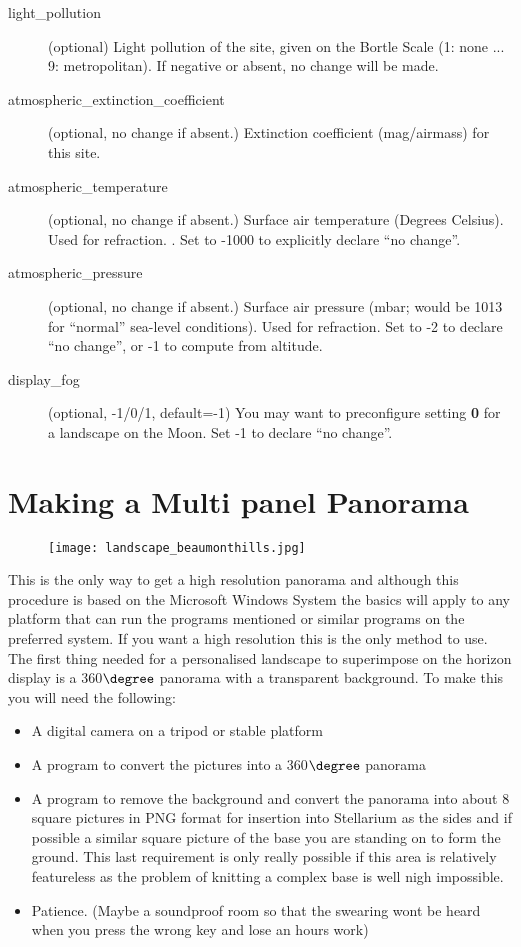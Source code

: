 \begin{description}
\item[light\_pollution] (optional) Light pollution of the site,
  given on the Bortle Scale (1: none ... 9: metropolitan). If negative
  or absent, no change will be made.
\item[atmospheric\_extinction\_coefficient] (optional, no change if
  absent.) Extinction coefficient (mag/airmass) for this site.
\item[atmospheric\_temperature] (optional, no change if absent.)
  Surface air temperature (Degrees Celsius). Used for refraction. . Set
  to -1000 to explicitly declare ``no change''.
\item[atmospheric\_pressure] (optional, no change if absent.)
  Surface air pressure (mbar; would be 1013 for ``normal'' sea-level
  conditions). Used for refraction. Set to -2 to declare ``no change'',
  or -1 to compute from altitude.
\item[display\_fog] (optional, -1/0/1, default=-1) You may want to
  preconfigure setting \textbf{0} for a landscape on the Moon. Set -1 to
  declare ``no change''.
\end{description}

\section{Making a Multi panel Panorama}\label{making-a-multi-panel-panorama}

\begin{figure}[h]
\centering\texttt{[image: landscape\_beaumonthills.jpg]}
\end{figure}

This is the only way to get a high resolution panorama and although this
procedure is based on the Microsoft Windows System the basics will apply
to any platform that can run the programs mentioned or similar programs
on the preferred system. If you want a high resolution this is the only
method to use. The first thing needed for a personalised landscape to
superimpose on the horizon display is a 360$\degree$ panorama with a transparent
background. To make this you will need the following:

\begin{itemize}
\item
  A digital camera on a tripod or stable platform
\item
  A program to convert the pictures into a 360$\degree$ panorama
\item
  A program to remove the background and convert the panorama into about
  8 square pictures in PNG format for insertion into Stellarium as the
  sides and if possible a similar square picture of the base you are
  standing on to form the ground. This last requirement is only really
  possible if this area is relatively featureless as the problem of
  knitting a complex base is well nigh impossible.
\item
  Patience. (Maybe a soundproof room so that the swearing wont be heard
  when you press the wrong key and lose an hours work)
\end{itemize}

